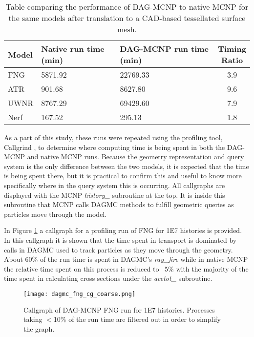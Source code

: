 \begin{table}[H]
  \centering
  \begin{tabular}{l l l c}
    \toprule
    Model & Native run time (min) & DAG-MCNP run time (min) & \thead{Timing \\ Ratio} \\
    \hline
    FNG   & 5871.92           & 22769.33            & 3.9   \\
    ATR   & 901.68            & 8627.80             & 9.6   \\
    UWNR  & 8767.29           & 69429.60            & 7.9   \\
    Nerf  & 167.52            & 295.13              & 1.8   \\
    \hline
  \end{tabular}
  \caption[DAG-MCNP performance benchmarking.]{Table comparing the performance of DAG-MCNP to native MCNP for the
    same models after translation to a CAD-based tessellated surface mesh.}
  \label{dag-mcnp-benchmarks}  
\end{table}

As a part of this study, these runs were repeated using the profiling tool,
Callgrind \cite{Pena_2016}, to determine where computing time is being spent in
both the DAG-MCNP and native MCNP runs. Because the geometry representation and
query system is the only difference between the two models, it is expected that
the time is being spent there, but it is practical to confirm this and useful to
know more specifically where in the query system this is occurring. All
callgraphs are displayed with the MCNP \textit{history\_} subroutine at the
top. It is inside this subroutine that MCNP calls DAGMC methods to fulfill
geometric queries as particles move through the model.

In Figure \ref{dagmc-fng-coarse} a callgraph for a profiling run of FNG for
\num{1E7} histories is provided. In this callgraph it is shown that the time
spent in transport is dominated by calls in DAGMC used to track particles as
they move through the geometry. About 60\% of the run time is spent in DAGMC's
\textit{ray\_fire} while in native MCNP the relative time spent on this process
is reduced to ~5\% with the majority of the time spent in calculating cross
sections under the \textit{acetot\_} subroutine.

\begin{figure}[H]
  \centering
  \caption[Callgraph of a DAG-MCNP simulation.]{Callgraph of DAG-MCNP FNG run for \num{1E7} histories. Processes taking
    $<$10\% of the run time are filtered out in order to simplify the graph.}
  \label{dagmc-fng-coarse}
  \texttt{[image: dagmc\_fng\_cg\_coarse.png]}
\end{figure}

